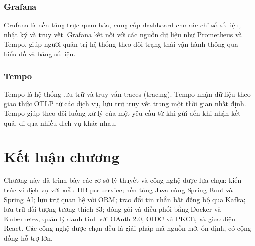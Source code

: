 \documentclass[../BTL.tex]{subfiles}
\begin{document}
\subsubsection{Grafana}
Grafana là nền tảng trực quan hóa, cung cấp dashboard cho các chỉ số số liệu, nhật ký và truy vết. Grafana kết nối với các nguồn dữ liệu như Prometheus và Tempo, giúp người quản trị hệ thống theo dõi trạng thái vận hành thông qua biểu đồ và bảng số liệu.

\subsubsection{Tempo}
Tempo là hệ thống lưu trữ và truy vấn traces (tracing). Tempo nhận dữ liệu theo giao thức OTLP từ các dịch vụ, lưu trữ truy vết trong một thời gian nhất định. Tempo giúp theo dõi luồng xử lý của một yêu cầu từ khi gửi đến khi nhận kết quả, đi qua nhiều dịch vụ khác nhau.

\section{Kết luận chương}
\label{section:1.11}

Chương này đã trình bày các cơ sở lý thuyết và công nghệ được lựa chọn: kiến trúc vi dịch vụ với mẫu DB-per-service; nền tảng Java cùng Spring Boot và Spring AI; lưu trữ quan hệ với ORM; trao đổi tin nhắn bất đồng bộ qua Kafka; lưu trữ đối tượng tương thích S3; đóng gói và điều phối bằng Docker và Kubernetes; quản lý danh tính với OAuth 2.0, OIDC và PKCE; và giao diện React. Các công nghệ được chọn đều là giải pháp mã nguồn mở, ổn định, có cộng đồng hỗ trợ lớn.
\end{document}
